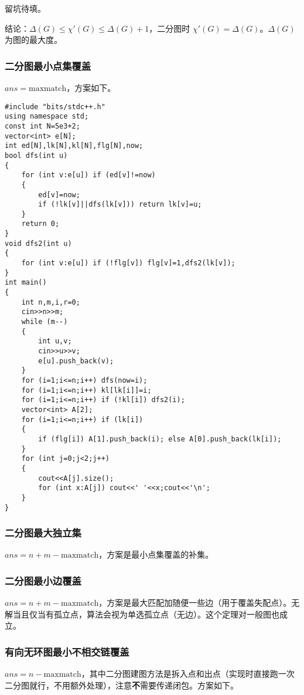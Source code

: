 \documentclass[12pt]{ctexart}
\begin{document}
留坑待填。

结论：$\Delta(G)\le \chi'(G) \le \Delta(G)+1$，二分图时 $\chi'(G)=\Delta(G)$。$\Delta(G)$ 为图的最大度。

\subsubsection{二分图最小点集覆盖}

$ans=\text{maxmatch}$，方案如下。

\begin{lstlisting}
#include "bits/stdc++.h"
using namespace std;
const int N=5e3+2;
vector<int> e[N];
int ed[N],lk[N],kl[N],flg[N],now;
bool dfs(int u)
{
	for (int v:e[u]) if (ed[v]!=now)
	{
		ed[v]=now;
		if (!lk[v]||dfs(lk[v])) return lk[v]=u;
	}
	return 0;
}
void dfs2(int u)
{
	for (int v:e[u]) if (!flg[v]) flg[v]=1,dfs2(lk[v]);
}
int main()
{
	int n,m,i,r=0;
	cin>>n>>m;
	while (m--)
	{
		int u,v;
		cin>>u>>v;
		e[u].push_back(v);
	}
	for (i=1;i<=n;i++) dfs(now=i);
	for (i=1;i<=n;i++) kl[lk[i]]=i;
	for (i=1;i<=n;i++) if (!kl[i]) dfs2(i);
	vector<int> A[2];
	for (i=1;i<=n;i++) if (lk[i])
	{
		if (flg[i]) A[1].push_back(i); else A[0].push_back(lk[i]);
	}
	for (int j=0;j<2;j++)
	{
		cout<<A[j].size();
		for (int x:A[j]) cout<<' '<<x;cout<<'\n';
	}
}
\end{lstlisting}

\subsubsection{二分图最大独立集}

$ans=n+m-\text{maxmatch}$，方案是最小点集覆盖的补集。

\subsubsection{二分图最小边覆盖}

$ans=n+m-\text{maxmatch}$，方案是最大匹配加随便一些边（用于覆盖失配点）。无解当且仅当有孤立点，算法会视为单选孤立点（无边）。这个定理对一般图也成立。

\subsubsection{有向无环图最小不相交链覆盖}

$ans=n-\text{maxmatch}$，其中二分图建图方法是拆入点和出点（实现时直接跑一次二分图就行，不用额外处理），注意\textbf{不}需要传递闭包。方案如下。
\end{document}
